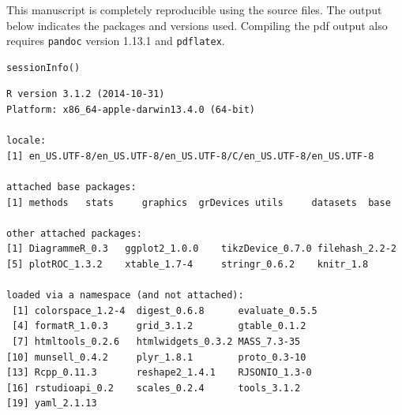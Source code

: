 \documentclass[article]{jss}
\begin{document}
This manuscript is completely reproducible using the source files. The
output below indicates the  packages and versions used.
Compiling the pdf output also requires \texttt{pandoc} version 1.13.1
and \texttt{pdflatex}.

\begin{verbatim}
sessionInfo()
\end{verbatim}

\begin{verbatim}
R version 3.1.2 (2014-10-31)
Platform: x86_64-apple-darwin13.4.0 (64-bit)

locale:
[1] en_US.UTF-8/en_US.UTF-8/en_US.UTF-8/C/en_US.UTF-8/en_US.UTF-8

attached base packages:
[1] methods   stats     graphics  grDevices utils     datasets  base     

other attached packages:
[1] DiagrammeR_0.3   ggplot2_1.0.0    tikzDevice_0.7.0 filehash_2.2-2  
[5] plotROC_1.3.2    xtable_1.7-4     stringr_0.6.2    knitr_1.8       

loaded via a namespace (and not attached):
 [1] colorspace_1.2-4  digest_0.6.8      evaluate_0.5.5   
 [4] formatR_1.0.3     grid_3.1.2        gtable_0.1.2     
 [7] htmltools_0.2.6   htmlwidgets_0.3.2 MASS_7.3-35      
[10] munsell_0.4.2     plyr_1.8.1        proto_0.3-10     
[13] Rcpp_0.11.3       reshape2_1.4.1    RJSONIO_1.3-0    
[16] rstudioapi_0.2    scales_0.2.4      tools_3.1.2      
[19] yaml_2.1.13      
\end{verbatim}


%

\end{document}

